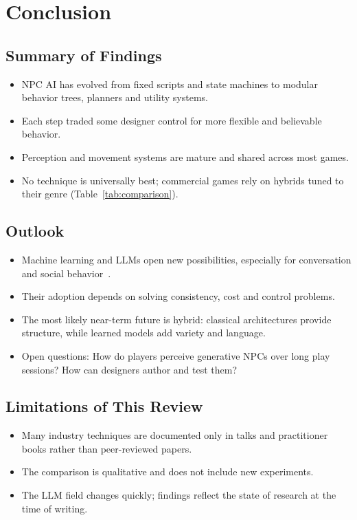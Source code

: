 \section{Conclusion}
\label{sec:conclusion}

\subsection{Summary of Findings}
\begin{itemize}
  \item NPC AI has evolved from fixed scripts and state machines to
        modular behavior trees, planners and utility systems.
  \item Each step traded some designer control for more flexible and
        believable behavior.
  \item Perception and movement systems are mature and shared across most
        games.
  \item No technique is universally best; commercial games rely on hybrids
        tuned to their genre (Table~\ref{tab:comparison}).
\end{itemize}

\subsection{Outlook}
\begin{itemize}
  \item Machine learning and LLMs open new possibilities, especially for
        conversation and social behavior~\cite{park2023,gallotta2024}.
  \item Their adoption depends on solving consistency, cost and control
        problems.
  \item The most likely near-term future is hybrid: classical architectures
        provide structure, while learned models add variety and language.
  \item Open questions: How do players perceive generative NPCs over long
        play sessions? How can designers author and test them?
\end{itemize}

\subsection{Limitations of This Review}
\begin{itemize}
  \item Many industry techniques are documented only in talks and
        practitioner books rather than peer-reviewed papers.
  \item The comparison is qualitative and does not include new
        experiments.
  \item The LLM field changes quickly; findings reflect the state of
        research at the time of writing.
\end{itemize}
